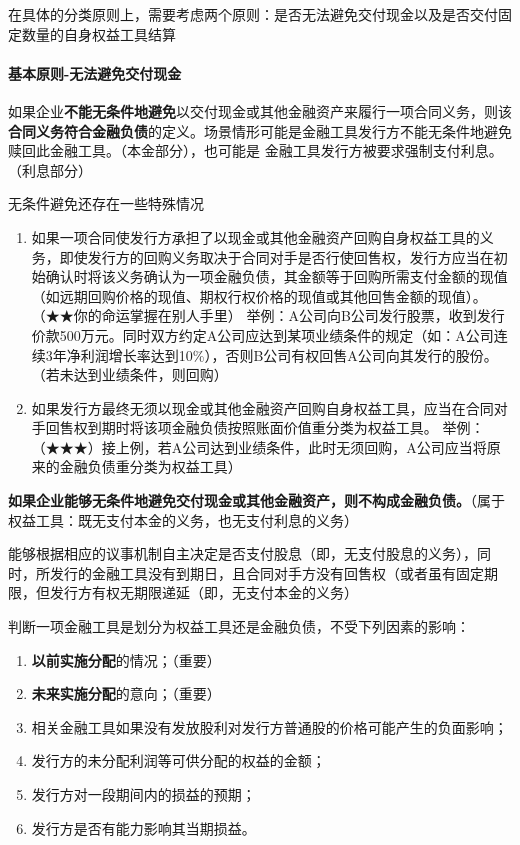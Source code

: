 \documentclass[UTF8,12pt]{ctexart}
\numberwithin{equation}{section} %
\numberwithin{figure}{section}
\numberwithin{table}{section}
\begin{document}
	在具体的分类原则上，需要考虑两个原则：是否无法避免交付现金以及是否交付固定数量的自身权益工具结算
	
	\paragraph{基本原则-无法避免交付现金}
	
	如果企业\textbf{不能无条件地避免}以交付现金或其他金融资产来履行一项合同义务，则该\textbf{合同义务符合金融负债}的定义。场景情形可能是金融工具发行方不能无条件地避免赎回此金融工具。（本金部分），也可能是 金融工具发行方被要求强制支付利息。（利息部分）
	
	无条件避免还存在一些特殊情况
	\begin{enumerate}
		\item 如果一项合同使发行方承担了以现金或其他金融资产回购自身权益工具的义务，即使发行方的回购义务取决于合同对手是否行使回售权，发行方应当在初始确认时将该义务确认为一项金融负债，其金额等于回购所需支付金额的现值（如远期回购价格的现值、期权行权价格的现值或其他回售金额的现值）。（★★你的命运掌握在别人手里）
		举例：A公司向B公司发行股票，收到发行价款500万元。同时双方约定A公司应达到某项业绩条件的规定（如：A公司连续3年净利润增长率达到10\%），否则B公司有权回售A公司向其发行的股份。（若未达到业绩条件，则回购）
		
		\item 如果发行方最终无须以现金或其他金融资产回购自身权益工具，应当在合同对手回售权到期时将该项金融负债按照账面价值重分类为权益工具。
		举例：（★★★）接上例，若A公司达到业绩条件，此时无须回购，A公司应当将原来的金融负债重分类为权益工具）
	\end{enumerate}

	\textbf{如果企业能够无条件地避免交付现金或其他金融资产，则不构成金融负债。}（属于权益工具：既无支付本金的义务，也无支付利息的义务）
	
	能够根据相应的议事机制自主决定是否支付股息（即，无支付股息的义务），同时，所发行的金融工具没有到期日，且合同对手方没有回售权（或者虽有固定期限，但发行方有权无期限递延（即，无支付本金的义务）
	
	判断一项金融工具是划分为权益工具还是金融负债，不受下列因素的影响：
	\begin{enumerate}
		\item \textbf{以前实施分配}的情况；（重要）
		
		\item \textbf{未来实施分配}的意向；（重要）
		
		\item 相关金融工具如果没有发放股利对发行方普通股的价格可能产生的负面影响；
		
		\item 发行方的未分配利润等可供分配的权益的金额；
		
		\item 发行方对一段期间内的损益的预期；
		
		\item 发行方是否有能力影响其当期损益。
	\end{enumerate}
	
\end{document}
